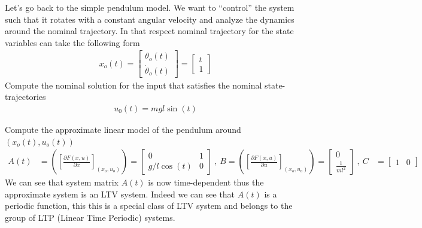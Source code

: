 \documentclass[twoside]{article}
\begin{document}
Let's go back to the simple pendulum model. We want to ``control'' the
system such that it rotates with a constant angular velocity and
analyze the dynamics around the nominal trajectory. In that
respect nominal trajectory for the state variables can take the
following form
%
\begin{align*}
x_o(t) = \left[ \begin{array}{c} \theta_o(t) \\ \dot{\theta}_o(t) \end{array}
  \right] = \left[ \begin{array}{c} t \\ 1 \end{array}
  \right] 
\end{align*}
%
Compute the nominal solution for the input that satisfies the nominal
state-trajectories
%
%
\begin{align*}
u_0(t) = m g l \sin(t)
\end{align*}
%

Compute the approximate linear model of the pendulum around $(x_o(t),u_o(t)) $
%
\begin{align*}
A(t) &= \left( \left[ \frac{\partial F(x,u)}{\partial x}
                      \right]_{(x_o,u_o)} \right) =
                    \left[ \begin{array}{cc} 0 & 1 \\ g/l \cos(t) & 0 \end{array}  \right]
\ , \ B = \left( \left[ \frac{\partial F(x,u)}{\partial u}
                      \right]_{(x_o,u_o)} \right) =
                                                            \left[ \begin{array}{c}
                                                                     0
                                                                     \\
                                                                     \frac{1}{m
                                                                     l^2}  \end{array}  \right]
\ , \
C &= \left[ \begin{array}{cc} 1 & 0 \end{array}  \right]
\end{align*}
%
We can see that system matrix $A(t)$ is now time-dependent thus the
approximate system is an LTV system. Indeed we can see that $A(t)$ is
a periodic function, this this is a special class of LTV system and
belongs to the group of LTP (Linear Time Periodic) systems. 

\end{document}
